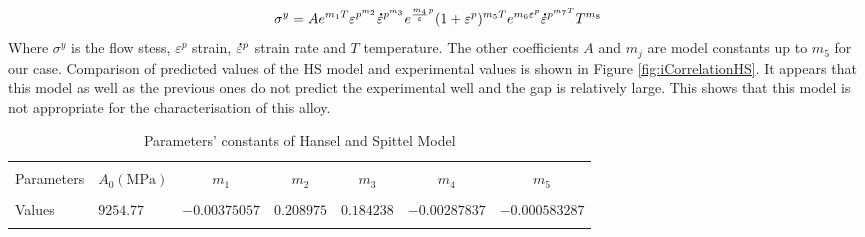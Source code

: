 \documentclass[twoside,english,1p,final,sort&compress]{elsarticle}
\theoremstyle{plain}
\newcommand{\mdot}[1]{\accentset{\mbox{\bfseries .}}{#1}}
\begin{document}
\begin{equation}
\sigma^y = Ae^{m_1T}\varepsilon^{p^{m_2}}\mdot\varepsilon^{p^{m_3}}e^{\frac{m_4}\varepsilon^p}(1+\varepsilon^p)^{m_5T}e^{m_6\varepsilon^p}\mdot\varepsilon^{p^{m_7T}}T^{m_8}
\end{equation}
Where $\sigma^y$ is the flow stess, $\varepsilon^p$ strain, $\mdot\varepsilon^p$ strain rate and $T$ temperature. The other coefficients $A$ and $m_j$ are model constants up to $m_5$ for our case. Comparison of predicted values of the HS model and experimental values is shown in Figure \ref{fig:iCorrelationHS}. It appears that this model as well as the previous ones do not predict the experimental well and the gap is relatively large. This shows that this model is not appropriate for the characterisation of this alloy.
\begin{table}[h!]
\centering{}
\caption{Parameters' constants of Hansel and Spittel Model}
\begin{tabular}{llccccc}
\hline
&         &             &		   &		 &			   &\\
Parameters&$A_0(\text{MPa})$    &$m_1$        & $m_2$     & $m_3$   & $m_4$       &$m_5$\\
&         &             &		   &	     &	           &\\
\hline
Values&$9254.77$&$-0.00375057$& $0.208975$&$0.184238$&$-0.00287837$&$-0.000583287$\\
\hline
\label{tab: HSparameters}
\end{tabular}
\end{table}
\end{document}
